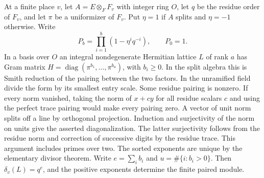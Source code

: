 \documentclass[a4paper,11pt]{article}
\theoremstyle{definition}
\theoremstyle{remark}
\numberwithin{equation}{section}
\begin{document}
At a finite place \(v\), let \(A=E\otimes_F F_v\) with
integer ring \(O\), let \(q\) be the residue order of \(F_v\),
and let \(\pi\) be a uniformizer of \(F_v\). Put \(\eta=1\)
if \(A\) splits and \(\eta=-1\) otherwise. Write
\[
       P_b=\prod_{i=1}^{b}(1-\eta^i q^{-i}),\qquad P_0=1 .
\]
In a basis over \(O\) an integral nondegenerate Hermitian
lattice \(L\) of rank \(a\) has Gram matrix
\(H=\operatorname{diag}(\pi^{b_1},\ldots,\pi^{b_a})\),
with \(b_i\ge0\). In the split algebra this is Smith reduction
of the pairing between the two factors. In the unramified
field divide the form by its smallest entry scale. Some
residue pairing is nonzero. If every norm vanished, taking
the norm of \(x+c y\) for all residue scalars \(c\) and using
the perfect trace pairing would make every pairing zero.
A vector of unit norm splits off a line by orthogonal
projection. Induction and surjectivity of the norm on units
give the asserted diagonalization. The latter surjectivity
follows from the residue norm and correction of successive
digits by the residue trace. This argument includes primes
over two. The sorted exponents are unique by the elementary
divisor theorem. Write \(e=\sum_i b_i\) and
\(u=\#\{i:b_i>0\}\). Then \(\delta_v(L)=q^e\), and the
positive exponents determine the finite paired module.
\end{document}
